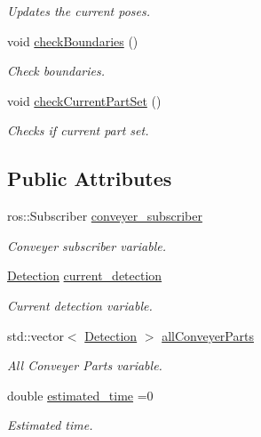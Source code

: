 \begin{DoxyCompactItemize}
\begin{DoxyCompactList}\small\item\em Updates the current poses. \end{DoxyCompactList}\item 
void \hyperlink{classConveyerParts_a1a9fca855f6455ba350de65acab56051}{check\+Boundaries} ()
\begin{DoxyCompactList}\small\item\em Check boundaries. \end{DoxyCompactList}\item 
void \hyperlink{classConveyerParts_a8fb0ac9bde6ae5ffea922768e68026a2}{check\+Current\+Part\+Set} ()
\begin{DoxyCompactList}\small\item\em Checks if current part set. \end{DoxyCompactList}\end{DoxyCompactItemize}
\subsection*{Public Attributes}
\begin{DoxyCompactItemize}
\item 
\mbox{\label{classConveyerParts_a8cd52489a957397b51b4e1be2bcd84d9}} 
ros\+::\+Subscriber \hyperlink{classConveyerParts_a8cd52489a957397b51b4e1be2bcd84d9}{conveyer\+\_\+subscriber}
\begin{DoxyCompactList}\small\item\em Conveyer subscriber variable. \end{DoxyCompactList}\item 
\mbox{\label{classConveyerParts_aa604a79b48159e651800911a4c26a13d}} 
\hyperlink{classDetection}{Detection} \hyperlink{classConveyerParts_aa604a79b48159e651800911a4c26a13d}{current\+\_\+detection}
\begin{DoxyCompactList}\small\item\em Current detection variable. \end{DoxyCompactList}\item 
std\+::vector$<$ \hyperlink{classDetection}{Detection} $>$ \hyperlink{classConveyerParts_ab75ade698ffee71ccf3792d22917eb95}{all\+Conveyer\+Parts}
\begin{DoxyCompactList}\small\item\em All Conveyer Parts variable. \end{DoxyCompactList}\item 
\mbox{\label{classConveyerParts_a4147928a7d87b11ad6dfa179cbfc3a5c}} 
double \hyperlink{classConveyerParts_a4147928a7d87b11ad6dfa179cbfc3a5c}{estimated\+\_\+time} =0
\begin{DoxyCompactList}\small\item\em Estimated time. \end{DoxyCompactList}\end{DoxyCompactItemize}


